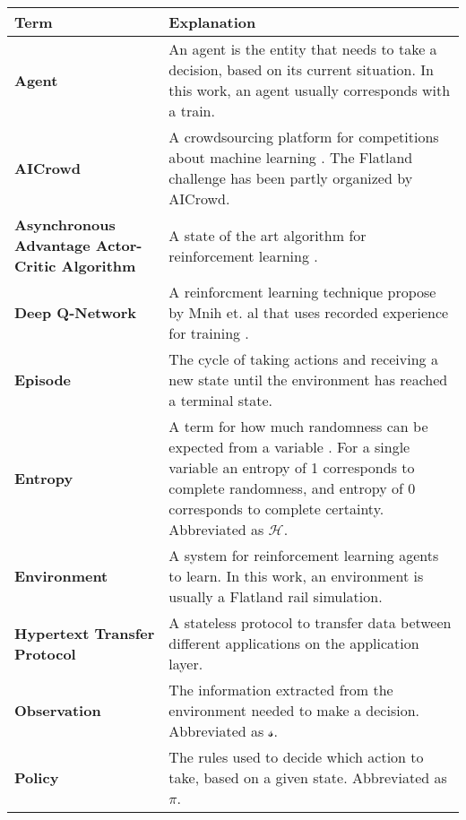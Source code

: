 \begin{longtable}{|m{3cm}|m{11cm}|}\hline
\rowcolor{gray} \textbf{Term}&
Explanation \\ 
\hline

\textbf{Agent}&
An agent is the entity that needs to take a decision, based on its current situation. In this work, an agent usually corresponds with a train.\\
\hline

\textbf{AICrowd}&
A crowdsourcing platform for competitions about machine learning \cite{aicrowd_startpage}. The Flatland challenge has been partly organized by AICrowd.\\ 
\hline

\textbf{Asynchronous Advantage Actor-Critic Algorithm}&
A state of the art algorithm for reinforcement learning \cite{a3c}. \\
\hline

\textbf{Deep Q-Network}&
A reinforcment learning technique propose by Mnih et. al that uses recorded experience for training \cite{mnih2013playing}. \\
\hline


\textbf{Episode}&
The cycle of taking actions and receiving a new state until the environment has reached a terminal state. \\ 
\hline

\textbf{Entropy}&
A term for how much randomness can be expected from a variable \cite{entropy_shannon}.
For a single variable an entropy of 1 corresponds to complete randomness, and entropy of 0 corresponds to complete certainty.
Abbreviated as $\mathcal{H}$.\\ 
\hline

\textbf{Environment}&
A system for reinforcement learning agents to learn. In this work, an environment is usually a Flatland rail simulation.\\
\hline

\textbf{Hypertext Transfer Protocol}&
A stateless protocol to transfer data between different applications on the application layer. \\ \hline

\textbf{Observation}&
The information extracted from the environment needed to make a decision. Abbreviated as $\mathcal{s}$.\\ 
\hline

\textbf{Policy}&
The rules used to decide which action to take, based on a given state. Abbreviated as $\pi$.\\ 
\hline


\end{longtable}
